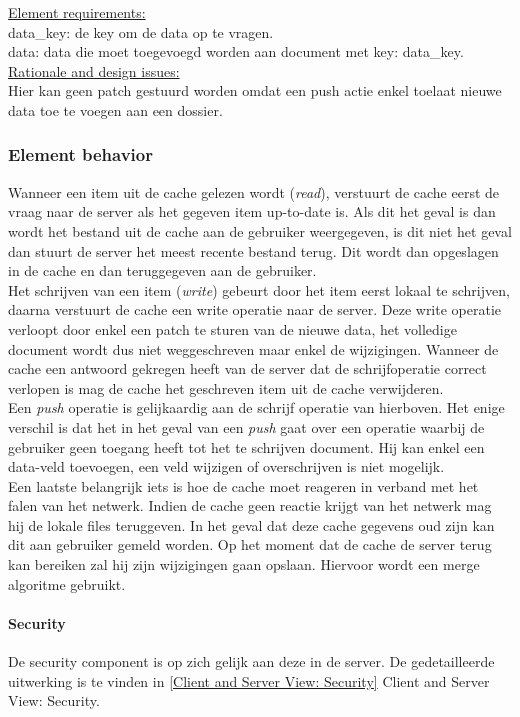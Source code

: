 \documentclass[a4paper,10pt]{article}
\begin{document}
\underline{Element requirements:}\\
data\_key: de key om de data op te vragen.\\
data: data die moet toegevoegd worden aan document met key: data\_key.\\

\underline{Rationale and design issues:}\\
Hier kan geen patch gestuurd worden omdat een push actie enkel toelaat nieuwe data toe te voegen aan een dossier.

\subsubsection{Element behavior}
Wanneer een item uit de cache gelezen wordt (\textit{read}), verstuurt de cache eerst de vraag naar de server als het gegeven item up-to-date is.  Als dit het geval is dan wordt het bestand uit de cache aan de gebruiker weergegeven, is dit niet het geval dan stuurt de server het meest recente bestand terug.  Dit wordt dan opgeslagen in de cache en dan teruggegeven aan de gebruiker.\\
Het schrijven van een item (\textit{write}) gebeurt door het item eerst lokaal te schrijven, daarna verstuurt de cache een write operatie naar de server.  Deze write operatie verloopt door enkel een patch te sturen van de nieuwe data, het volledige document wordt dus niet weggeschreven maar enkel de wijzigingen.  Wanneer de cache een antwoord gekregen heeft van de server dat de schrijfoperatie correct verlopen is mag de cache het geschreven item uit de cache verwijderen.\\
Een \textit{push} operatie is gelijkaardig aan de schrijf operatie van hierboven.  Het enige verschil is dat het in het geval van een \textit{push} gaat over een operatie waarbij de gebruiker geen toegang heeft tot het te schrijven document.  Hij kan enkel een data-veld toevoegen, een veld wijzigen of overschrijven is niet mogelijk.\\
Een laatste belangrijk iets is hoe de cache moet reageren in verband met het falen van het netwerk.  Indien de cache geen reactie krijgt van het netwerk mag hij de lokale files teruggeven.  In het geval dat deze cache gegevens oud zijn kan dit aan gebruiker gemeld worden.  Op het moment dat de cache de server terug kan bereiken zal hij zijn wijzigingen gaan opslaan.  Hiervoor wordt een merge algoritme gebruikt.

\paragraph{Security}
De security component is op zich gelijk aan deze in de server.  De gedetailleerde uitwerking is te vinden in \ref{Client and Server View: Security} Client and Server View: Security.
\end{document}
